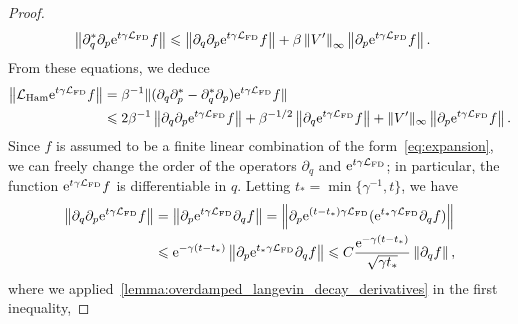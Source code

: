 \documentclass[11pt,a4paper]{article}
\begin{document}
\begin{proof}
\begin{align*}
        \norm{\partial_q^* \partial_p \e^{t \gamma \mathcal L_{\rm FD}} f}
        &\leq \norm{\partial_q \partial_p \e^{t \gamma \mathcal L_{\rm FD}} f}
        + \beta \norm{V'}[\infty] \norm{\partial_p \e^{t \gamma \mathcal L_{\rm FD}} f}.
    \end{align*}
    From these equations, we deduce
    \begin{align}
        \notag
        \norm{\mathcal L_{\rm Ham} \e^{t \gamma \mathcal L_{\rm FD}} f}
        &= \beta^{-1} \lVert (\partial_q \partial_p^* - \partial_q^* \partial_p) \e^{t \gamma \mathcal L_{\rm FD}} f \rVert \\
        \label{eq:reasoning_action_lham}
        &\leq 2 \beta^{-1} \norm{\partial_q \partial_p \e^{t \gamma \mathcal L_{\rm FD}} f}
        + \beta^{-1/2} \norm{\partial_q \e^{t \gamma \mathcal L_{\rm FD}} f}
        + \norm*{V'}[\infty] \norm{\partial_p \e^{t \gamma \mathcal L_{\rm FD}} f}.
    \end{align}
    Since $f$ is assumed to be a finite linear combination of the form~\eqref{eq:expansion},
    we can freely change the order of the operators $\partial_q$ and $\mathrm{e}^{t \gamma \mathcal L_{\rm FD}}$;
    in particular, the function $\mathrm{e}^{t \gamma \mathcal L_{\rm FD}} f$ is differentiable in $q$.
    Letting $t_* = \min\{ \gamma^{-1}, t\}$, we have
    \begin{align*}
        \norm{\partial_q \partial_p \e^{t \gamma \mathcal L_{\rm FD}} f}
        &= \norm{\partial_p \e^{t \gamma \mathcal L_{\rm FD}} \partial_q f}
        = \norm{\partial_p \e^{(t - t_*) \gamma \mathcal L_{\rm FD}} (\e^{t_* \gamma \mathcal L_{\rm FD}} \partial_q f)} \\
        &\leq \e^{- \gamma (t - t_*)} \norm{\partial_p \e^{t_* \gamma \mathcal L_{\rm FD}} \partial_q f}
        \leq C \frac{\e^{- \gamma (t - t_*)}}{\sqrt{\gamma t_*}} \norm{\partial_q f},
    \end{align*}
    where we applied~\eqref{lemma:overdamped_langevin_decay_derivatives} in the first inequality,

\end{proof}
\end{document}
